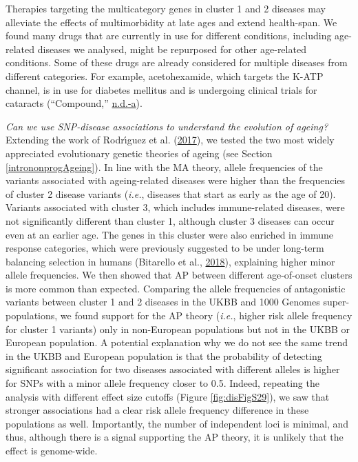 \documentclass[12pt,twoside]{unicam}
\begin{document}
Therapies targeting the multicategory genes in cluster 1 and 2 diseases may alleviate the effects of multimorbidity at late ages and extend health-span. We found many drugs that are currently in use for different conditions, including age-related diseases we analysed, might be repurposed for other age-related conditions. Some of these drugs are already considered for multiple diseases from different categories. For example, acetohexamide, which targets the K-ATP channel, is in use for diabetes mellitus and is undergoing clinical trials for cataracts (``Compound,'' \protect\hyperlink{ref-Acetohexamide2020}{n.d.}\protect\hyperlink{ref-Acetohexamide2020}{-a}).

\emph{Can we use SNP-disease associations to understand the evolution of ageing?} Extending the work of Rodrı́guez et al. (\protect\hyperlink{ref-Rodriguez2017}{2017}), we tested the two most widely appreciated evolutionary genetic theories of ageing (see Section \ref{intrononprogAgeing}). In line with the MA theory, allele frequencies of the variants associated with ageing-related diseases were higher than the frequencies of cluster 2 disease variants (\emph{i.e.}, diseases that start as early as the age of 20). Variants associated with cluster 3, which includes immune-related diseases, were not significantly different than cluster 1, although cluster 3 diseases can occur even at an earlier age. The genes in this cluster were also enriched in immune response categories, which were previously suggested to be under long-term balancing selection in humans (Bitarello et al., \protect\hyperlink{ref-Bitarello2018}{2018}), explaining higher minor allele frequencies. We then showed that AP between different age-of-onset clusters is more common than expected. Comparing the allele frequencies of antagonistic variants between cluster 1 and 2 diseases in the UKBB and 1000 Genomes super-populations, we found support for the AP theory (\emph{i.e.}, higher risk allele frequency for cluster 1 variants) only in non-European populations but not in the UKBB or European population. A potential explanation why we do not see the same trend in the UKBB and European population is that the probability of detecting significant association for two diseases associated with different alleles is higher for SNPs with a minor allele frequency closer to 0.5. Indeed, repeating the analysis with different effect size cutoffs (Figure \ref{fig:disFigS29}), we saw that stronger associations had a clear risk allele frequency difference in these populations as well. Importantly, the number of independent loci is minimal, and thus, although there is a signal supporting the AP theory, it is unlikely that the effect is genome-wide.
\end{document}
